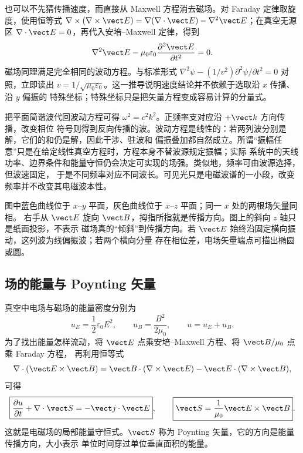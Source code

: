也可以不先猜传播速度，而直接从 Maxwell 方程消去磁场。对 Faraday 定律取旋度，使用恒等式
$\nabla\times(\nabla\times\vect E)=\nabla(\nabla\cdot\vect E)-\nabla^2\vect E$；在真空无源区
$\nabla\cdot\vect E=0$，再代入安培--Maxwell 定律，得到
\begin{equation}
  \nabla^2\vect E-\mu_0\varepsilon_0\frac{\partial^2\vect E}{\partial t^2}=0.
\end{equation}
磁场同理满足完全相同的波动方程。与标准形式
$\nabla^2\psi-(1/v^2)\partial^2\psi/\partial t^2=0$ 对照，立即读出
$v=1/\sqrt{\mu_0\varepsilon_0}$。这一推导说明速度结论并不依赖于选取沿 $x$ 传播、沿 $y$ 偏振的
特殊坐标；特殊坐标只是把矢量方程变成容易计算的分量式。

把平面简谐波代回波动方程可得 $\omega^2=c^2k^2$。正频率支对应沿 $+\vect k$ 方向传播，改变相位
符号则得到反向传播的波。波动方程是线性的：若两列波分别是解，它们的和仍是解，因此干涉、驻波和
偏振叠加都自然成立。所谓“振幅任意”只是在给定线性真空方程时，方程本身不替波源规定振幅；实际
系统中的天线功率、边界条件和能量守恒仍会决定可实现的场强。类似地，频率可由波源选择，但波速固定，
于是不同频率对应不同波长。可见光只是电磁波谱的一小段，改变频率并不改变其电磁波本性。

\planeWaveThreeDDiagram

图中蓝色曲线位于 $x$--$y$ 平面，灰色曲线位于 $x$--$z$ 平面；同一 $x$ 处的两根场矢量同相。
右手从 $\vect E$ 旋向 $\vect B$，拇指所指就是传播方向。图上的斜向 $z$ 轴只是纸面投影，不表示
磁场真的“倾斜”到传播方向。若 $\vect E$ 始终沿固定横向振动，这列波为线偏振波；若两个横向分量
存在相位差，电场矢量端点可描出椭圆或圆。

\subsection*{场的能量与 Poynting 矢量}

真空中电场与磁场的能量密度分别为
\begin{equation}
  u_E=\frac12\varepsilon_0E^2,
  \qquad
  u_B=\frac{B^2}{2\mu_0},
  \qquad u=u_E+u_B.
\end{equation}
为了找出能量怎样流动，将 $\vect E$ 点乘安培--Maxwell 方程、将 $\vect B/\mu_0$ 点乘 Faraday 方程，
再利用恒等式
\begin{equation}
  \nabla\cdot(\vect E\times\vect B)
  =\vect B\cdot(\nabla\times\vect E)-
  \vect E\cdot(\nabla\times\vect B),
\end{equation}
可得
\begin{equation}
  \boxed{\frac{\partial u}{\partial t}+\nabla\cdot\vect S=-\vect j\cdot\vect E},
  \qquad
  \boxed{\vect S=\frac{1}{\mu_0}\vect E\times\vect B}.
\end{equation}
这就是电磁场的局部能量守恒式。$\vect S$ 称为 Poynting 矢量，它的方向是能量传播方向，大小表示
单位时间穿过单位垂直面积的能量。


